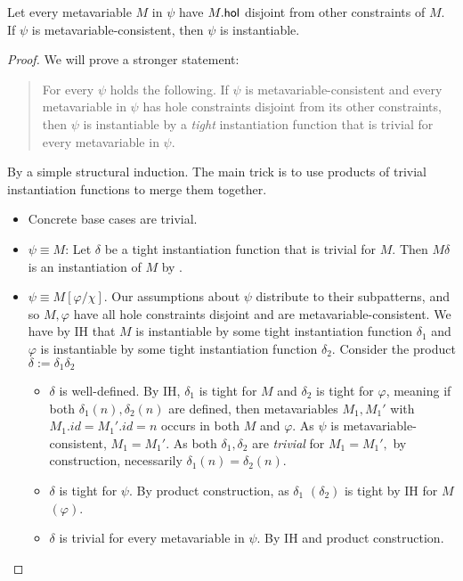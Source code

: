 \documentclass{mgr}
\begin{document}
\begin{theorem*}
  \label{theorem:disjoint_instantiability}
  Let every metavariable $M$ in $\psi$ have $M.\mathsf{hol}$ disjoint from other constraints of $M$.
  If $\psi$ is metavariable-consistent, then $\psi$ is instantiable.

  \begin{proof}
    We will prove a stronger statement:
    \begin{quote}
      For every $\psi$ holds the following.
      If $\psi$ is metavariable-consistent and every metavariable in $\psi$ has hole constraints disjoint from its other constraints, then $\psi$ is instantiable by a \emph{tight} instantiation function that is trivial for every metavariable in $\psi$.
    \end{quote}

    By a simple structural induction.
    The main trick is to use products of trivial instantiation functions to merge them together.

    \begin{itemize}
      \item Concrete base cases are trivial.
      \item $\psi \equiv M$: Let $\delta$ be a tight instantiation function that is trivial for $M$.
      Then $M\delta$ is an instantiation of $M$ by .
      \item $\psi \equiv M[\varphi/\chi]$.
      Our assumptions about $\psi$ distribute to their subpatterns, and so $M, \varphi$ have all hole constraints disjoint and are metavariable-consistent.
      We have by IH that $M$ is instantiable by some tight instantiation function $\delta_1$ and $\varphi$ is instantiable by some tight instantiation function $\delta_2$.
      Consider the product $\delta := \delta_1 \delta_2$
      \begin{itemize}
        \item $\delta$ is well-defined. By IH, $\delta_1$ is tight for $M$ and $\delta_2$ is tight for $\varphi$, meaning if both $\delta_1(n), \delta_2(n)$ are defined, then metavariables $M_1, M_1'$ with $M_1.id = M_1'.id = n$ occurs in both $M$ and $\varphi$.
        As $\psi$ is metavariable-consistent, $M_1 = M_1'$.
        As both $\delta_1, \delta_2$ are \emph{trivial} for $M_1 = M_1',$ by construction, necessarily $\delta_1(n) = \delta_2(n)$.
        \item $\delta$ is tight for $\psi$. By product construction, as $\delta_1$ $(\delta_2)$ is tight by IH for $M$ $(\varphi)$.
        \item $\delta$ is trivial for every metavariable in $\psi$. By IH and product construction.
      \end{itemize}


\end{itemize}
\end{proof}
\end{theorem*}
\end{document}
